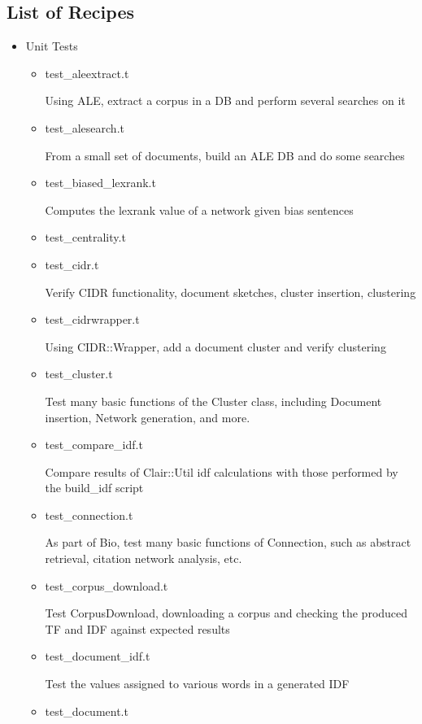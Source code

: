 \let\oldboxedverbatim=\boxedverbatim
\renewcommand{\boxedverbatim}{\footnotesize\oldboxedverbatim}

\subsection{List of Recipes}

\begin{itemize}
\item Unit Tests

\begin{itemize}
  \item test\_aleextract.t

 Using ALE, extract a corpus in a DB and perform several
 searches on it 
  \item test\_alesearch.t

 From a small set of documents, build an ALE DB and do some
 searches 
  \item test\_biased\_lexrank.t

 Computes the lexrank value of a network given bias sentences 
  \item test\_centrality.t

  \item test\_cidr.t

 Verify CIDR functionality, document sketches, cluster
 insertion, clustering  
  \item test\_cidrwrapper.t

 Using CIDR::Wrapper, add a document cluster and verify
 clustering 
  \item test\_cluster.t

 Test many basic functions of the Cluster class, including
 Document insertion, Network generation, and more. 
  \item test\_compare\_idf.t

 Compare results of Clair::Util idf calculations with
 those performed by the build\_idf script 
  \item test\_connection.t

 As part of Bio, test many basic functions of Connection,
 such as abstract retrieval, citation network analysis, etc.
  \item test\_corpus\_download.t

 Test CorpusDownload, downloading a corpus and checking the
 produced TF and IDF against expected results 
  \item test\_document\_idf.t

 Test the values assigned to various words in a generated IDF 
  \item test\_document.t


\end{itemize}
\end{itemize}

